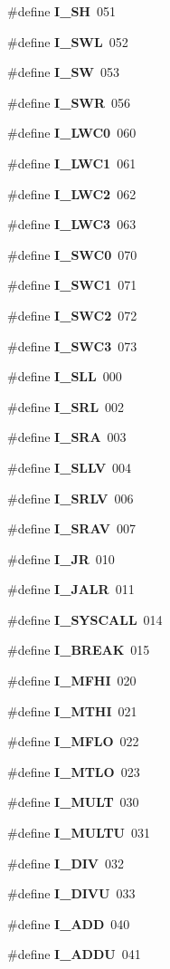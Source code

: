 \begin{DoxyCompactItemize}
\#define {\bf I\+\_\+\+SH}~051
\item 
\#define {\bf I\+\_\+\+S\+WL}~052
\item 
\#define {\bf I\+\_\+\+SW}~053
\item 
\#define {\bf I\+\_\+\+S\+WR}~056
\item 
\#define {\bf I\+\_\+\+L\+W\+C0}~060
\item 
\#define {\bf I\+\_\+\+L\+W\+C1}~061
\item 
\#define {\bf I\+\_\+\+L\+W\+C2}~062
\item 
\#define {\bf I\+\_\+\+L\+W\+C3}~063
\item 
\#define {\bf I\+\_\+\+S\+W\+C0}~070
\item 
\#define {\bf I\+\_\+\+S\+W\+C1}~071
\item 
\#define {\bf I\+\_\+\+S\+W\+C2}~072
\item 
\#define {\bf I\+\_\+\+S\+W\+C3}~073
\item 
\#define {\bf I\+\_\+\+S\+LL}~000
\item 
\#define {\bf I\+\_\+\+S\+RL}~002
\item 
\#define {\bf I\+\_\+\+S\+RA}~003
\item 
\#define {\bf I\+\_\+\+S\+L\+LV}~004
\item 
\#define {\bf I\+\_\+\+S\+R\+LV}~006
\item 
\#define {\bf I\+\_\+\+S\+R\+AV}~007
\item 
\#define {\bf I\+\_\+\+JR}~010
\item 
\#define {\bf I\+\_\+\+J\+A\+LR}~011
\item 
\#define {\bf I\+\_\+\+S\+Y\+S\+C\+A\+LL}~014
\item 
\#define {\bf I\+\_\+\+B\+R\+E\+AK}~015
\item 
\#define {\bf I\+\_\+\+M\+F\+HI}~020
\item 
\#define {\bf I\+\_\+\+M\+T\+HI}~021
\item 
\#define {\bf I\+\_\+\+M\+F\+LO}~022
\item 
\#define {\bf I\+\_\+\+M\+T\+LO}~023
\item 
\#define {\bf I\+\_\+\+M\+U\+LT}~030
\item 
\#define {\bf I\+\_\+\+M\+U\+L\+TU}~031
\item 
\#define {\bf I\+\_\+\+D\+IV}~032
\item 
\#define {\bf I\+\_\+\+D\+I\+VU}~033
\item 
\#define {\bf I\+\_\+\+A\+DD}~040
\item 
\#define {\bf I\+\_\+\+A\+D\+DU}~041

\end{DoxyCompactItemize}
